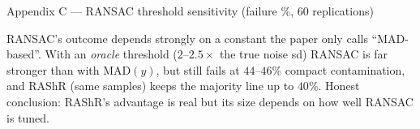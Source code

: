 \documentclass[aspectratio=169,9pt]{beamer}
\begin{document}
\begin{frame}{Appendix C --- RANSAC threshold sensitivity (failure \%, 60 replications)}
\scriptsize\renewcommand{\arraystretch}{1.2}
\medskip

\small RANSAC's outcome depends strongly on a constant the paper only calls ``MAD-based''. With an \emph{oracle} threshold ($2$--$2.5\times$ the true noise sd) RANSAC is far stronger than with $\mathrm{MAD}(y)$, but still fails at $44$--$46\%$ compact contamination, and RAShR (same samples) keeps the majority line up to $40\%$. Honest conclusion: RAShR's advantage is real but its size depends on how well RANSAC is tuned.
\end{frame}
\end{document}

